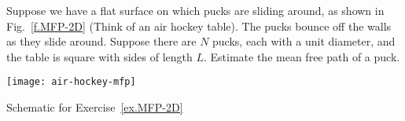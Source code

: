 \begin{exercisebox}\label{ex.MFP-2D}
    Suppose we have a flat surface on which pucks are sliding around, as shown in Fig.~\ref{f.MFP-2D} (Think of an air hockey table). The pucks bounce off the walls as they slide around.  Suppose there are $N$ pucks, each with a unit diameter, and the table is square with sides of length $L$.  Estimate the mean free path of a puck.
\end{exercisebox}

\begin{marginfigure}[-5\baselineskip]
    \texttt{[image: air-hockey-mfp]}
    \caption[Mean free path of a hockey puck]{\label{f.MFP-2D}Schematic for Exercise~\ref{ex.MFP-2D}}
\end{marginfigure}
